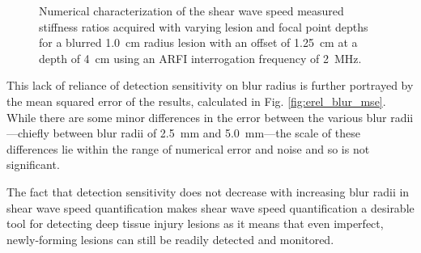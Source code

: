 			\begin{figure}[!htb]
				\centering
				\caption[Numerical characterization of shear wave speed measured stiffness ratio with blurred lesions]{Numerical characterization of the shear wave speed measured stiffness ratios acquired with varying lesion and focal point depths for a blurred \SI{1.0}{cm} radius lesion with an offset of \SI{1.25}{\cm} at a depth of \SI{4}{\cm} using an ARFI interrogation frequency of \SI{2}{\MHz}.}
				\label{fig:erel_blur}
			\end{figure}

			This lack of reliance of detection sensitivity on blur radius is further portrayed by the mean squared error of the results, calculated in Fig. \ref{fig:erel_blur_mse}. While there are some minor differences in the error between the various blur radii---chiefly between blur radii of \SI{2.5}{\mm} and \SI{5.0}{\mm}---the scale of these differences lie within the range of numerical error and noise and so is not significant.

			The fact that detection sensitivity does not decrease with increasing blur radii in shear wave speed quantification makes shear wave speed quantification a desirable tool for detecting deep tissue injury lesions as it means that even imperfect, newly-forming lesions can still be readily detected and monitored.

